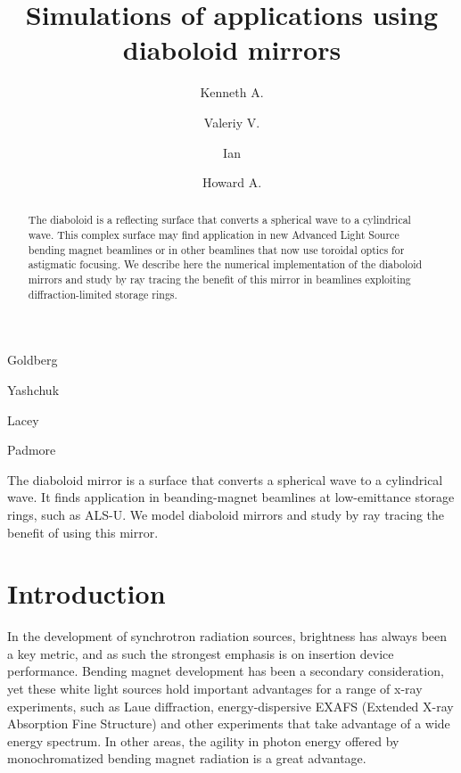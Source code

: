 \documentclass[preprint]{iucr}       %
\begin{document}




\title{Simulations of applications using diaboloid mirrors}

\author[a]{Kenneth A.}{Goldberg}
\author[a]{Valeriy V.}{Yashchuk}
\author[a]{Ian}{Lacey}
\author[a]{Howard A.}{Padmore}




\begin{synopsis}
The diaboloid mirror is a surface that converts a spherical wave to a cylindrical wave. It finds application in beanding-magnet beamlines at low-emittance storage rings, such as ALS-U. We model diaboloid mirrors and study by ray tracing the benefit of using this mirror.
\end{synopsis}

\begin{abstract}
The diaboloid is a reflecting surface that converts a spherical wave to a cylindrical wave. This complex surface may find application in new Advanced Light Source bending magnet beamlines or in other beamlines that now use toroidal optics for astigmatic focusing. We describe here the numerical implementation of the diaboloid mirrors and study by ray tracing the benefit of this mirror in beamlines exploiting diffraction-limited storage rings.
\end{abstract}

\section{Introduction}

In the development of synchrotron radiation sources, brightness has always been a key metric, and as such the strongest emphasis is on insertion device performance. Bending magnet development has been a secondary consideration, yet these white light sources hold important advantages for a range of x-ray experiments, such as Laue diffraction, energy-dispersive EXAFS (Extended X-ray Absorption Fine Structure) and other experiments that take advantage of a wide energy spectrum. In other areas, the agility in photon energy offered by monochromatized bending magnet radiation is a great advantage. 
\end{document}
